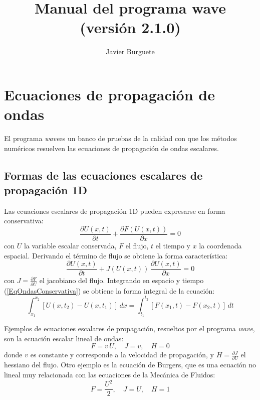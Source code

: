 \documentclass[a4paper,10pt]{report}
\title{Manual del programa wave (versión 2.1.0)}
\author{Javier Burguete}
\newcommand{\EQ}[2]{\begin{equation}#1\label{#2}\end{equation}}
\newcommand{\C}[1]{\left[#1\right]}
\newcommand{\PA}[1]{\left(#1\right)}
\newcommand{\PARTIAL}[2]{\frac{\partial#1}{\partial#2}}
\newcommand{\WAVE}{\emph{wave}}
\begin{document}
\maketitle

\tableofcontents

\chapter{Ecuaciones de propagación de ondas}

El programa \WAVE es un banco de pruebas de la calidad con que los métodos numéricos resuelven las ecuaciones de propagación de ondas escalares.

\section{Formas de las ecuaciones escalares de propagación 1D}

Las ecuaciones escalares de propagación 1D pueden expresarse en forma conservativa:
\EQ{\PARTIAL{U(x,t)}{t}+\PARTIAL{F(U(x,t))}{x}=0}{EqOndasConservativa}
con $U$ la variable escalar conservada, $F$ el flujo, $t$ el tiempo y $x$ la coordenada espacial. Derivando el término de flujo se obtiene la forma característica:
\EQ{\PARTIAL{U(x,t)}{t}+J(U(x,t))\,\PARTIAL{U(x,t)}{x}=0}{EqOndasCaracteristica}
con $J=\PARTIAL{F}{U}$ el jacobiano del flujo. Integrando en espacio y tiempo (\ref{EqOndasConservativa}) se obtiene la forma integral de la ecuación:
\EQ
{
	\int_{x_1}^{x_2}\C{U\PA{x,t_2}-U\PA{x,t_1}}\,dx=
	\int_{t_1}^{t_2}\C{F\PA{x_1,t}-F\PA{x_2,t}}\,dt
}{EqOndasIntegral}

Ejemplos de ecuaciones escalares de propagación, resueltos por el programa \WAVE, son la ecuación escalar lineal de ondas:
\EQ{F=v\,U,\quad J=v,\quad H=0}{EqLineal}
donde $v$ es constante y corresponde a la velocidad de propagación, y $H=\PARTIAL{J}{U}$ el hessiano del flujo. Otro ejemplo es la ecuación de Burgers, que es una ecuación no lineal muy relacionada con las ecuaciones de la Mecánica de Fluidos:
\EQ{F=\frac{U^2}{2},\quad J=U,\quad H=1}{EqBurgers}
\end{document}
